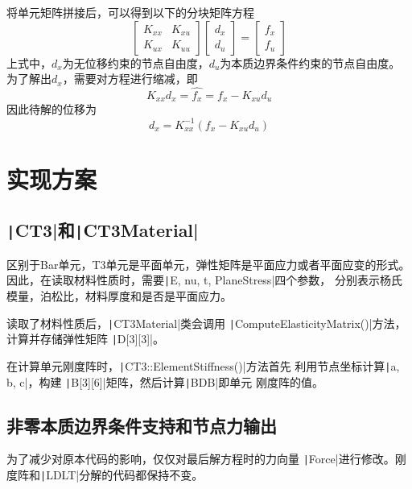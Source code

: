 \documentclass[12pt,a4paper]{article}
\newcommand{\code}{\texttt}
\begin{document}
将单元矩阵拼接后，可以得到以下的分块矩阵方程
\begin{equation}
    \begin{bmatrix}
        K_{xx} & K_{xu}\\
        K_{ux} & K_{uu}
    \end{bmatrix}
    \begin{bmatrix}
        d_x \\ d_u
    \end{bmatrix}
    =
    \begin{bmatrix}
        f_x \\ f_u
    \end{bmatrix}
\end{equation}
上式中，$d_x$为无位移约束的节点自由度，$d_u$为本质边界条件约束的节点自由度。
为了解出$d_x$，需要对方程进行缩减，即
\begin{equation}
    K_{xx}d_x = 
    \hat{f_x}
    =
    f_x - K_{xu}d_u
\end{equation}
因此待解的位移为
\begin{equation}
    d_x = K_{xx}^{-1}(f_x - K_{xu}d_u)
\end{equation}

\section{实现方案}
\subsection{\texttt|CT3|和\texttt|CT3Material|}
区别于Bar单元，T3单元是平面单元，弹性矩阵是平面应力或者平面应变的形式。
因此，在读取材料性质时，需要\texttt|E, nu, t, PlaneStress|四个参数，
分别表示杨氏模量，泊松比，材料厚度和是否是平面应力。

读取了材料性质后，\texttt|CT3Material|类会调用
\texttt|ComputeElasticityMatrix()|方法，计算并存储弹性矩阵
\texttt|D[3][3]|。

在计算单元刚度阵时，\texttt|CT3::ElementStiffness()|方法首先
利用节点坐标计算\texttt|a, b, c|，构建
\texttt|B[3][6]|矩阵，然后计算\texttt|BDB|即单元
刚度阵的值。

\subsection{非零本质边界条件支持和节点力输出}
为了减少对原本代码的影响，仅仅对最后解方程时的力向量
\texttt|Force|进行修改。刚度阵和\code|LDLT|分解的代码都保持不变。
\end{document}
